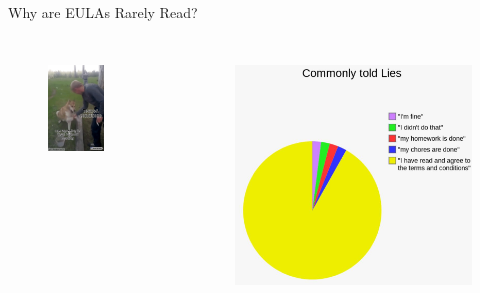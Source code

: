 \begin{frame}{Why are EULAs Rarely Read?}
\begin{columns}[c]
    \centering
    \begin{figure}
        \centering
        \includegraphics[width=0.65\textwidth]{images/dog.png}
        \label{fig:dog}
    \end{figure}  
    \centering
    \begin{figure}
        \centering
        \includegraphics[width=\textwidth]{images/lies.jpg}
        \label{fig:lies}
    \end{figure}    
\end{columns}
\end{frame}
